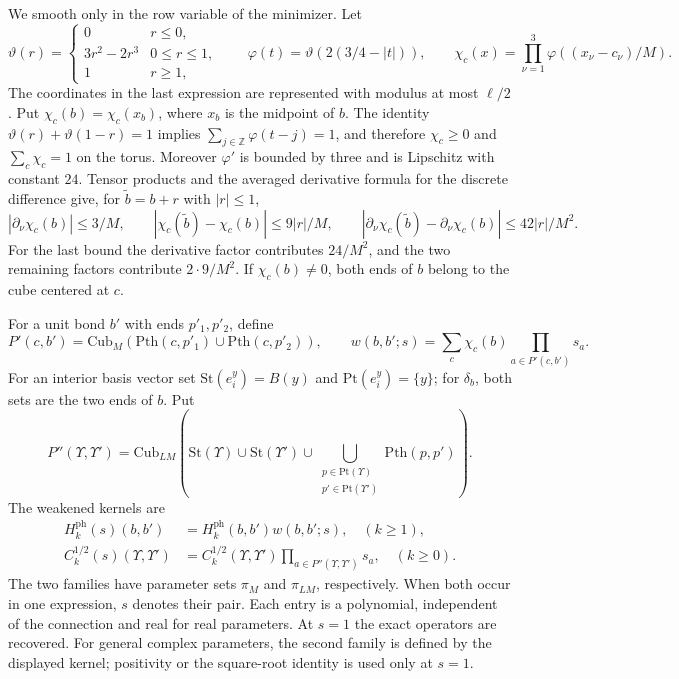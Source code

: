 \documentclass[11pt,letterpaper,reqno]{amsart}
\newcommand{\Z}{\mathbb Z}
\begin{document}
We smooth only in the row variable of the minimizer. Let
\[
 \vartheta(r)=
 \begin{cases}0&r\le0,\\3r^2-2r^3&0\le r\le1,\\1&r\ge1,
 \end{cases}
 \qquad
 \varphi(t)=\vartheta(2(3/4-|t|)),
 \qquad
 \chi_c(x)=\prod_{\nu=1}^3\varphi((x_\nu-c_\nu)/M).
\]
The coordinates in the last expression are represented with
modulus at most $\ell/2$. Put $\chi_c(b)=\chi_c(x_b)$, where
$x_b$ is the midpoint of $b$. The identity
$\vartheta(r)+\vartheta(1-r)=1$ implies
$\sum_{j\in\Z}\varphi(t-j)=1$, and therefore
$\chi_c\ge0$ and $\sum_c\chi_c=1$ on the torus.
Moreover $\varphi'$ is bounded by three and is Lipschitz with
constant $24$. Tensor products and the averaged derivative
formula for the discrete difference give, for $\tilde b=b+r$
with $|r|\le1$,
\begin{equation}\label{eq:photon-cutoff-differences}
 |\partial_\nu\chi_c(b)|\le3/M,\qquad
 |\chi_c(\tilde b)-\chi_c(b)|\le9|r|/M,\qquad
 |\partial_\nu\chi_c(\tilde b)-\partial_\nu\chi_c(b)|
                                                     \le42|r|/M^2.
\end{equation}
For the last bound the derivative factor contributes $24/M^2$,
and the two remaining factors contribute $2\cdot9/M^2$.
If $\chi_c(b)\ne0$, both ends of $b$ belong to the cube centered
at $c$.

For a unit bond $b'$ with ends $p'_1,p'_2$, define
\[
 P'(c,b')=\mathrm{Cub}_M
                 (\mathrm{Pth}(c,p'_1)\cup\mathrm{Pth}(c,p'_2)),
 \qquad
 w(b,b';s)=\sum_c\chi_c(b)\prod_{a\in P'(c,b')}s_a.
\]
For an interior basis vector set
$\mathrm{St}(e_i^y)=B(y)$ and $\mathrm{Pt}(e_i^y)=\{y\}$;
for $\delta_b$, both sets are the two ends of $b$. Put
\[
 P''(\Upsilon,\Upsilon')=\mathrm{Cub}_{LM}
 \left(\mathrm{St}(\Upsilon)\cup\mathrm{St}(\Upsilon')
 \cup\!\!\bigcup_{\substack{p\in\mathrm{Pt}(\Upsilon)\\
                           p'\in\mathrm{Pt}(\Upsilon')}}
                                  \mathrm{Pth}(p,p')\right).
\]
The weakened kernels are
\begin{equation}\label{eq:photon-weakened-definitions}
 \begin{split}
 H_k^{\mathrm{ph}}(s)(b,b')&=H_k^{\mathrm{ph}}(b,b')w(b,b';s),
                                                  \quad(k\ge1),\\
 C_k^{1/2}(s)(\Upsilon,\Upsilon')
    &=C_k^{1/2}(\Upsilon,\Upsilon')
                         \prod_{a\in P''(\Upsilon,\Upsilon')}s_a,
                                                  \quad(k\ge0).
 \end{split}
\end{equation}
The two families have parameter sets $\pi_M$ and $\pi_{LM}$,
respectively. When both occur in one expression, $s$ denotes
their pair. Each entry is a polynomial, independent of the
connection and real for real parameters. At $s=1$ the exact
operators are recovered. For general complex parameters, the
second family is defined by the displayed kernel; positivity
or the square-root identity is used only at $s=1$.
\end{document}
